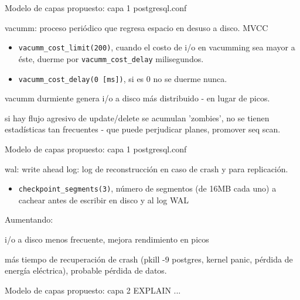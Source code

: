 \documentclass[11pt,spanish]{article}
\newcommand{\rowsp}[1][1em]{\vspace{#1}}
\newcommand{\hone}[1]{{\rowsp[0.3em]\noindent\Large #1 \rowsp[0.3em]}}
\newcommand{\myitm}[1]{\begin{itemize}#1\end{itemize}}
\newcommand{\mydesc}[1]{%
	\begin{description}
	\setlength\itemsep{0em}%
	#1
	\end{description}
}
\newcommand{\pros}{\item[pros:]}
\newcommand{\cons}{\item[cons:]}
\begin{document}
\newpage %
\hone{Modelo de capas propuesto: capa 1 postgresql.conf}

\mydesc{
	\item[vacumm:] proceso periódico que regresa espacio en desuso a disco.
	MVCC
	\myitm{
		\item \lstinline!vacumm_cost_limit(200)!, cuando el costo de i/o
		en vacumming sea mayor a éste, duerme por
		\lstinline!vacumm_cost_delay! milisegundos.
		\item \lstinline!vacumm_cost_delay(0 [ms])!, si es 0 no se
		duerme nunca.
	}
	\pros vacumm durmiente genera i/o a disco más distribuido - en lugar de
	picos.
	\cons si hay flujo agresivo de update/delete se acumulan 'zombies', 
		no se tienen estadísticas tan frecuentes - que puede perjudicar
		planes, promover seq scan.
}

\newpage %
\hone{Modelo de capas propuesto: capa 1 postgresql.conf}
\mydesc{
	\item[wal:] write ahead log: log de reconstrucción en caso de crash y
	para replicación.
	\myitm{
		\item \lstinline!checkpoint_segments(3)!, número de segmentos (de
		16MB cada uno) a cachear antes de escribir en disco y al log WAL
	}

	Aumentando:
	\pros i/o a disco menos frecuente, mejora rendimiento en picos
	\cons más tiempo de recuperación de crash (pkill -9 postgres, kernel
	panic, pérdida de energía eléctrica), probable pérdida de datos.
}

\newpage %
\hone{Modelo de capas propuesto: capa 2 EXPLAIN ...}
\end{document}

